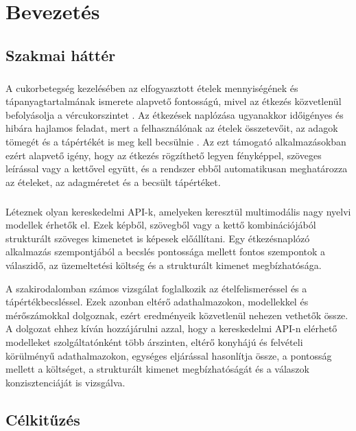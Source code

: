 \chapter{Bevezetés}
\section{Szakmai háttér}
\paragraph{}A cukorbetegség kezelésében az elfogyasztott ételek mennyiségének és
tápanyagtartalmának ismerete alapvető fontosságú, mivel az étkezés közvetlenül
befolyásolja a vércukorszintet \cite{ada2026soc5}.
Az étkezések naplózása ugyanakkor időigényes és hibára hajlamos feladat, mert a
felhasználónak az ételek összetevőit, az adagok tömegét és a tápértékét is meg kell
becsülnie \cite{cordeiro2015barriers, amorim2024carbcounting}.
Az ezt támogató alkalmazásokban ezért alapvető igény, hogy az étkezés rögzíthető
legyen fényképpel, szöveges leírással vagy a kettővel együtt, és a rendszer ebből automatikusan
meghatározza az ételeket, az adagméretet és a becsült tápértéket.

\paragraph{}
Léteznek olyan kereskedelmi API-k, amelyeken keresztül multimodális 
nagy nyelvi modellek érhetők el. Ezek képből, szövegből vagy a kettő kombinációjából strukturált szöveges kimenetet is képesek előállítani. 
Egy étkezésnaplózó alkalmazás szempontjából a becslés pontossága mellett fontos szempontok a válaszidő, az üzemeltetési
költség és a strukturált kimenet megbízhatósága. 

A szakirodalomban számos vizsgálat foglalkozik az ételfelismeréssel és 
a tápértékbecsléssel. Ezek azonban eltérő adathalmazokon, modellekkel 
és mérőszámokkal dolgoznak, ezért eredményeik közvetlenül nehezen vethetők össze. 
A dolgozat ehhez kíván hozzájárulni azzal, hogy a kereskedelmi API-n 
elérhető modelleket szolgáltatónként több árszinten, eltérő 
konyhájú és felvételi körülményű adathalmazokon, egységes 
eljárással hasonlítja össze, a pontosság mellett a költséget,
a strukturált kimenet megbízhatóságát és a válaszok konzisztenciáját is vizsgálva.

\section{Célkitűzés}
